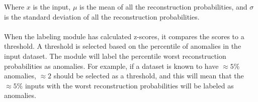 \noindent
Where $x$ is the input, $\mu$ is the mean of all the reconstruction probabilities, and $\sigma$ is the standard deviation of all the reconstruction probabilities.
\\\\
When the labeling module has calculated z-scores, it compares the scores to a threshold. A threshold is selected based on the percentile of anomalies in the input dataset. The module will label the percentile worst reconstruction probabilities as anomalies. 
For example, if a dataset is known to have $\approx 5\%$ anomalies, $\approx 2$ should be selected as a threshold, and this will mean that the $\approx 5\%$ inputs with the worst reconstruction probabilities will be labeled as anomalies.